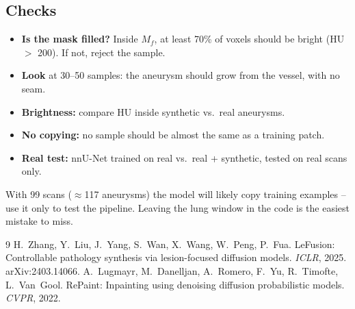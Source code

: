 \documentclass[11pt,a4paper]{article}
\begin{document}
\subsection{Checks}
\begin{itemize}
  \item \textbf{Is the mask filled?} Inside $M_f$, at least 70\% of voxels should be bright (HU $>$ 200). If not, reject the sample.
  \item \textbf{Look} at 30--50 samples: the aneurysm should grow from the vessel, with no seam.
  \item \textbf{Brightness:} compare HU inside synthetic vs.\ real aneurysms.
  \item \textbf{No copying:} no sample should be almost the same as a training patch.
  \item \textbf{Real test:} nnU-Net trained on real vs.\ real + synthetic, tested on real scans only.
\end{itemize}

\begin{caution}
With 99 scans ($\approx$117 aneurysms) the model will likely copy training examples -- use it only to test the pipeline. Leaving the lung window in the code is the easiest mistake to miss.
\end{caution}

\begin{thebibliography}{9}\small
{} H.~Zhang, Y.~Liu, J.~Yang, S.~Wan, X.~Wang, W.~Peng, P.~Fua. LeFusion: Controllable pathology synthesis via lesion-focused diffusion models. \emph{ICLR}, 2025. arXiv:2403.14066.
 A.~Lugmayr, M.~Danelljan, A.~Romero, F.~Yu, R.~Timofte, L.~Van~Gool. RePaint: Inpainting using denoising diffusion probabilistic models. \emph{CVPR}, 2022.
\end{thebibliography}
\end{document}
